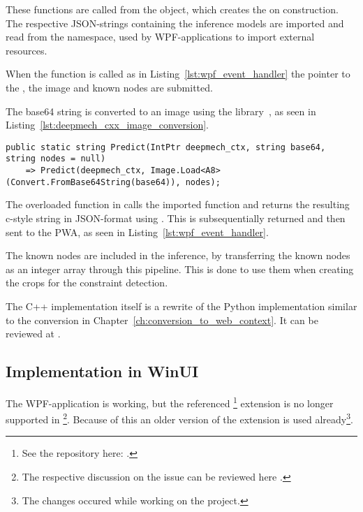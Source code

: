These functions are called from the  object, which creates the  on construction.
The respective JSON-strings containing the inference models are imported and read from the  namespace, used by WPF-applications to import external resources.

When the  function is called as in Listing~\ref{lst:wpf_event_handler} the pointer to the , the image and known nodes are submitted.

The base64 string is converted to an image using the  library~\cite{SixLabors2021}, as seen in Listing~\ref{lst:deepmech_cxx_image_conversion}.

\begin{lstlisting}[label={lst:deepmech_cxx_image_conversion}, caption={Deepmech\_cxx overload for image conversion.}]
public static string Predict(IntPtr deepmech_ctx, string base64, string nodes = null)
    => Predict(deepmech_ctx, Image.Load<A8>(Convert.FromBase64String(base64)), nodes);
\end{lstlisting}

The overloaded  function in  calls the imported  function and returns the resulting c-style string in JSON-format using .
This is subsequentially returned and then sent to the PWA, as seen in Listing~\ref{lst:wpf_event_handler}.

The known nodes are included in the inference, by transferring the known nodes as an integer array through this pipeline.
This is done to use them when creating the crops for the constraint detection.

The C++ implementation itself is a rewrite of the Python implementation similar to the conversion in Chapter~\ref{ch:conversion_to_web_context}.
It can be reviewed at .

\subsection{Implementation in WinUI}

The WPF-application is working, but the referenced \footnote{See the repository here: .} extension is no longer supported in \footnote{The respective discussion on the issue can be reviewed here .}.
Because of this an older version of the extension is used already\footnote{The changes occured while working on the project.}.

